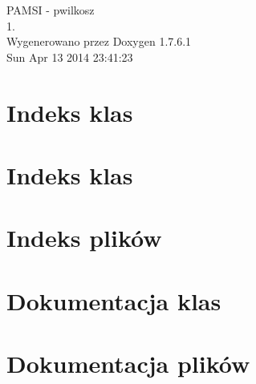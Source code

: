 \documentclass[a4paper]{book}
\begin{document}
\hypersetup{pageanchor=false,citecolor=blue}
\begin{titlepage}
\vspace*{7cm}
\begin{center}
{\Large \-P\-A\-M\-S\-I -\/ pwilkosz \\[1ex]\large 1. }\\
\vspace*{1cm}
{\large \-Wygenerowano przez Doxygen 1.7.6.1}\\
\vspace*{0.5cm}
{\small Sun Apr 13 2014 23:41:23}\\
\end{center}
\end{titlepage}
\clearemptydoublepage
{}
\tableofcontents
\clearemptydoublepage
{}
\hypersetup{pageanchor=true,citecolor=blue}
\chapter{\-Indeks klas}

\chapter{\-Indeks klas}

\chapter{\-Indeks plików}

\chapter{\-Dokumentacja klas}






















\chapter{\-Dokumentacja plików}















\printindex
\end{document}
